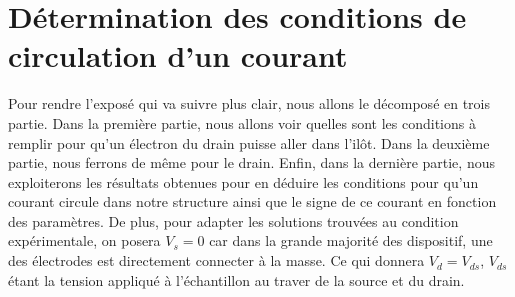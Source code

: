 \section{Détermination des conditions de circulation d'un courant}
Pour rendre l'exposé qui va suivre plus clair, nous allons le décomposé en trois partie. Dans la première partie, nous allons voir quelles sont les conditions à remplir pour qu'un électron du drain puisse aller dans l'il\^ot. Dans la deuxième partie, nous ferrons de m\^eme pour le drain. Enfin, dans la dernière partie, nous exploiterons les résultats obtenues pour en déduire les conditions pour qu'un courant circule dans notre structure ainsi que le signe de ce courant en fonction des paramètres. De plus, pour adapter les solutions trouvées au condition expérimentale, on posera $V_s = 0$ car dans la grande majorité des dispositif, une des électrodes est directement connecter à la masse. Ce qui donnera $V_d=V_{ds}$, $V_{ds}$ étant la tension appliqué à l'échantillon au traver de la source et du drain.

